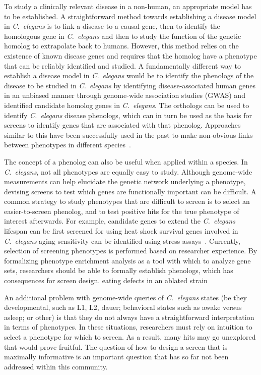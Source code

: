 \documentclass[10pt, onecolumn]{article}
\newcommand{\cel}{\emph{C.~elegans}}
\begin{document}
To study a clinically relevant disease in a non-human, an appropriate model has
to be established. A straightforward method towards establishing a disease model
in \cel{} is to link a disease to a causal gene, then to identify the homologous
gene in \cel{} and then to study the function of the genetic homolog to
extrapolate back to humans. However, this method relies on the existence of
known disease genes and requires that the homolog have a phenotype that can be
reliably identified and studied. A fundamentally different way to establish a
disease model in \cel{} would be to identify the phenologs of the disease to be
studied in \cel{} by identifying disease-associated human genes in an unbiased
manner through genome-wide association studies (GWAS) and identified candidate
homolog genes in \cel{}. The orthologs can be used to identify \cel{} disease
phenologs, which can in turn be used as the basis for screens to identify genes
that are associated with that phenolog. Approaches similar to this have been
successfully used in the past to make non-obvious links between phenotypes in
different species~\cite{McGary2010}.

The concept of a phenolog can also be useful when applied within a species. In
\cel{}, not all phenotypes are equally easy to study. Although genome-wide
measurements can help elucidate the genetic network underlying a phenotype,
devising screens to test which genes are functionally important can be
difficult. A common strategy to study phenotypes that are difficult to screen is
to select an easier-to-screen phenolog, and to test positive hits for the true
phenotype of interest afterwards. For example, candidate genes to extend the
\cel{} lifespan can be first screened for using heat shock survival genes
involved in \cel{} aging sensitivity can be identified using stress
assays~\cite{Kim2007a,Mehta2009}. Currently, selection of screening phenotypes
is performed based on researcher experience. By formalizing phenotype enrichment
analysis as a tool with which to analyze gene sets, researchers should be able
to formally establish phenologs, which has consequences for screen design. %
eating defects in an ablated strain

An additional problem with genome-wide queries of \cel{} states (be they
developmental, such as L1, L2, dauer; behavioral states such as awake versus
asleep; or other) is that they do not always have a straightforward
interpretation in terms of phenotypes. In these situations, researchers must
rely on intuition to select a phenotype for which to screen. As a result, many
hits may go unexplored that would prove fruitful. The question of how to design
a screen that is maximally informative is an important question that has so far
not been addressed within this community.
\end{document}
